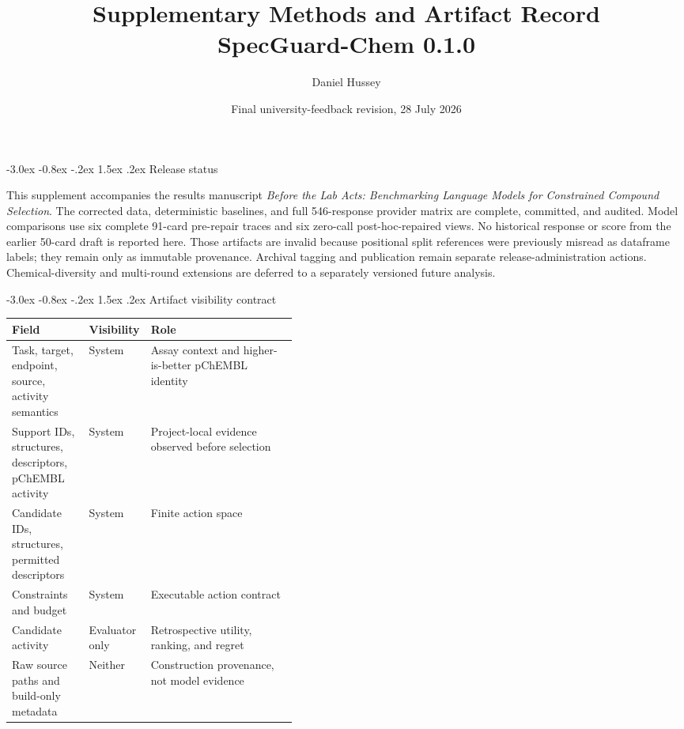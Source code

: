 \documentclass[10pt,a4paper]{article}
\title{\textbf{Supplementary Methods and Artifact Record}\\
SpecGuard-Chem 0.1.0}
\author{Daniel Hussey}
\date{Final university-feedback revision, 28 July 2026}
\makeatletter
\renewcommand\section{\@startsection{section}{1}{\z@}%
  {-3.0ex \@plus -0.8ex \@minus -.2ex}%
  {1.5ex \@plus .2ex}%
  {\normalfont\Large\bfseries}}
\makeatother
\begin{document}
\maketitle
\small
{}

\section{Release status}

This supplement accompanies the results manuscript \emph{Before the Lab Acts:
Benchmarking Language Models for Constrained Compound Selection}. The corrected
data, deterministic baselines, and full 546-response provider matrix are
complete, committed, and audited. Model comparisons use six complete 91-card
pre-repair traces and six zero-call post-hoc-repaired views. No historical
response or score from the earlier 50-card draft is reported here. Those
artifacts are invalid because positional split references were previously
misread as dataframe labels; they remain only as immutable provenance.
Archival tagging and publication remain separate release-administration
actions. Chemical-diversity and multi-round extensions are deferred to a
separately versioned future analysis.

\section{Artifact visibility contract}

\begin{table}[h]
\centering
\small
\begin{tabularx}{\linewidth}{@{}p{0.27\linewidth}p{0.15\linewidth}Y@{}}
\toprule
\textbf{Field} & \textbf{Visibility} & \textbf{Role} \\
\midrule
Task, target, endpoint, source, activity semantics & System & Assay context and higher-is-better pChEMBL identity \\
Support IDs, structures, descriptors, pChEMBL activity & System & Project-local evidence observed before selection \\
Candidate IDs, structures, permitted descriptors & System & Finite action space \\
Constraints and budget & System & Executable action contract \\
Candidate activity & Evaluator only & Retrospective utility, ranking, and regret \\
Raw source paths and build-only metadata & Neither & Construction provenance, not model evidence \\
\bottomrule
\end{tabularx}
\end{table}
\end{document}
